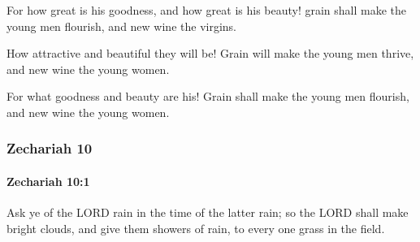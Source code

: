 			\begin{versebox}
					\item[BHS] 
					\item[LXX] 
					\item[ASV] For how great is his goodness, and how great is his beauty! grain shall make the young men flourish, and new wine the virgins.
					\item[NIV] How attractive and beautiful they will be! Grain will make the young men thrive, and new wine the young women.
					\item[NRSV] For what goodness and beauty are his! Grain shall make the young men flourish, and new wine the young women.
			\end{versebox}
	\subsubsection{Zechariah 10} %
		\label{ZECHARIAH-10}

		\paragraph{Zechariah 10:1} %
			\label{ZECHARIAH-10-1}

			Ask ye of the LORD rain in the time of the latter rain; so the LORD shall make bright clouds, and give them showers of rain, to every one grass in the field.

